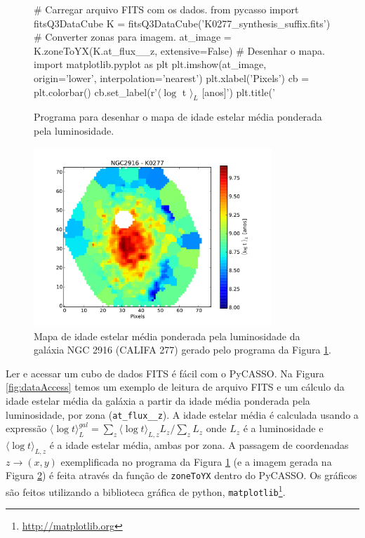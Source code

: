 \begin{figure}
	\begin{python}
# Carregar arquivo FITS com os dados.
from pycasso import fitsQ3DataCube
K = fitsQ3DataCube('K0277_synthesis_suffix.fits')
# Converter zonas para imagem.
at_image = K.zoneToYX(K.at_flux__z, extensive=False)
# Desenhar o mapa.
import matplotlib.pyplot as plt
plt.imshow(at_image, origin='lower', interpolation='nearest')
plt.xlabel('Pixels')
cb = plt.colorbar()
cb.set_label(r'$\langle \log$ t $\rangle_L$ [anos]')
plt.title('%
	\end{python}
	\caption[Programa idade estelar média.]
	{Programa para desenhar o mapa de idade	estelar média ponderada pela luminosidade.}
	\label{fig:programaMapaIdade}
\end{figure}

\begin{figure}
	\includegraphics[width=0.8\textwidth]{figuras/K0277-at_flux_zone.pdf}
	\caption[Mapa da idade estelar média da galáxia NGC 2916 (CALIFA 277).]
	{Mapa de idade estelar média ponderada pela luminosidade da galáxia NGC 2916 (CALIFA 277) gerado pelo programa da
	Figura \ref{fig:programaMapaIdade}.}
	\label{fig:mapaIdade}
\end{figure}

Ler e acessar um cubo de dados FITS é fácil com o PyCASSO. Na Figura \ref{fig:dataAccess} temos um exemplo de leitura de arquivo FITS e um cálculo da idade estelar média da galáxia a partir da idade média ponderada pela luminosidade, por zona (\texttt{at\_flux\_\_z}). A idade estelar média é calculada usando a expressão $ \langle \log t \rangle^{gal}_L = \sum_z \langle \log t \rangle_{L,z} L_z /\sum_z L_z$ onde $L_z $ é a luminosidade e $ \langle \log t \rangle_{L,z} $ é a idade estelar média, ambas por zona. A passagem de coordenadas $z \to (x, y)$ exemplificada no programa da Figura \ref{fig:programaMapaIdade} (e a imagem gerada na Figura \ref{fig:mapaIdade}) é feita através da função de \texttt{zoneToYX} dentro do PyCASSO. Os gráficos são feitos utilizando a biblioteca gráfica de {\sc python}, \texttt{matplotlib}\footnote{\href{http://matplotlib.org}{http://matplotlib.org}}.

